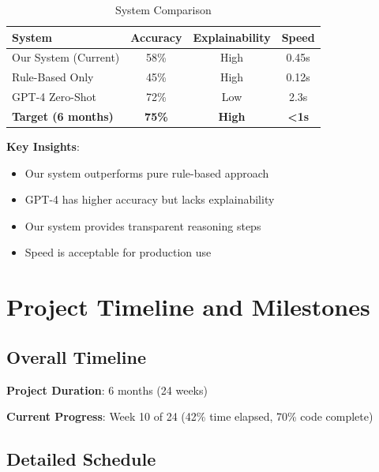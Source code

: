 \documentclass[12pt,a4paper]{article}
\begin{document}
\begin{table}[H]
\centering
\begin{tabular}{|l|c|c|c|}
\hline
\textbf{System} & \textbf{Accuracy} & \textbf{Explainability} & \textbf{Speed} \\
\hline
Our System (Current) & 58\% & High & 0.45s \\
Rule-Based Only & 45\% & High & 0.12s \\
GPT-4 Zero-Shot & 72\% & Low & 2.3s \\
\textbf{Target (6 months)} & \textbf{75\%} & \textbf{High} & \textbf{<1s} \\
\hline
\end{tabular}
\caption{System Comparison}
\end{table}

\textbf{Key Insights}:
\begin{itemize}
    \item Our system outperforms pure rule-based approach
    \item GPT-4 has higher accuracy but lacks explainability
    \item Our system provides transparent reasoning steps
    \item Speed is acceptable for production use
\end{itemize}

\newpage

\section{Project Timeline and Milestones}

\subsection{Overall Timeline}

\textbf{Project Duration}: 6 months (24 weeks)

\textbf{Current Progress}: Week 10 of 24 (42\% time elapsed, 70\% code complete)

\subsection{Detailed Schedule}
\end{document}
